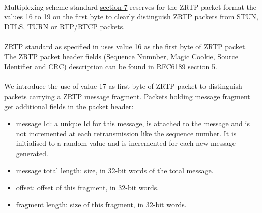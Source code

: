 \documentclass[a4paper,11pt]{article}
\begin{document}
\paragraph*{}Multiplexing scheme standard\citep{rfc7983} \href{https://datatracker.ietf.org/doc/html/rfc7983#section-7}{section 7} reserves for the ZRTP packet format the values 16 to 19 on the first byte to clearly distinguish ZRTP packets from STUN, DTLS, TURN or RTP/RTCP packets.

\paragraph*{}ZRTP standard as specified in \citep{rfc6189} uses value 16 as the first byte of ZRTP packet. The ZRTP packet header fields (Sequence Numnber, Magic Cookie, Source Identifier and CRC) description can be found in RFC6189 \href{https://datatracker.ietf.org/doc/html/rfc6189#section-5}{section 5}.

\paragraph*{}We introduce the use of value 17 as first byte of ZRTP packet to distinguish packets carrying a ZRTP message fragment. Packets holding message fragment get additional fields in the packet header:
\begin{itemize}
  \item message Id: a unique Id for this message, is attached to the message and is not incremented at each retransmission like the sequence number. It is initialised to a random value and is incremented for each new message generated.
  \item message total length: size, in 32-bit words of the total message.
  \item offset: offset of this fragment, in 32-bit words.
  \item fragment length: size of this fragment, in 32-bit words.
\end{itemize}
\end{document}
